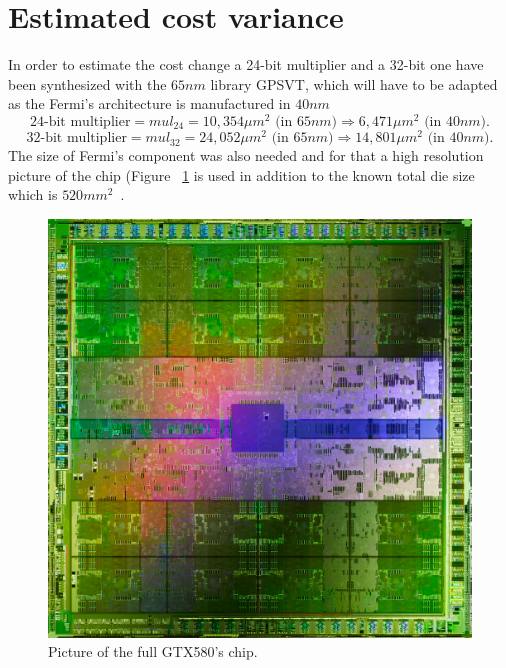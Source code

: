 \documentclass{report}
\begin{document}
   \section{Estimated cost variance}
   In order to estimate the cost change a 24-bit multiplier and a 32-bit one have been synthesized with the $65nm$ library GPSVT, which will have to be adapted as the Fermi's architecture is manufactured in $40nm$~\cite{GTX580Datasheet}
   \[\text{24-bit multiplier} = mul_{24} = 10,354 \mu m^2 \text{ (in $65nm$)} \Rightarrow 6,471 \mu m^2 \text{ (in $40nm$)}.\]
   \[\text{32-bit multiplier} = mul_{32} = 24,052 \mu m^2 \text{ (in $65nm$)} \Rightarrow 14,801 \mu m^2 \text{ (in $40nm$)}.\]
   The size of Fermi's component was also needed and for that a high resolution picture of the chip (Figure ~\ref{fig:fermiChip} is used in addition to the known total die size which is $520 mm^2$~\cite{G5xxwiki}.
   \begin{figure}[H]
    \centering
        \includegraphics[width=0.7\linewidth]{pictures/FermiChip}
        \captionsetup{justification=centering}
        \caption{Picture of the full GTX580's chip.}
        \label{fig:fermiChip}
    \end{figure}
   
\end{document}
